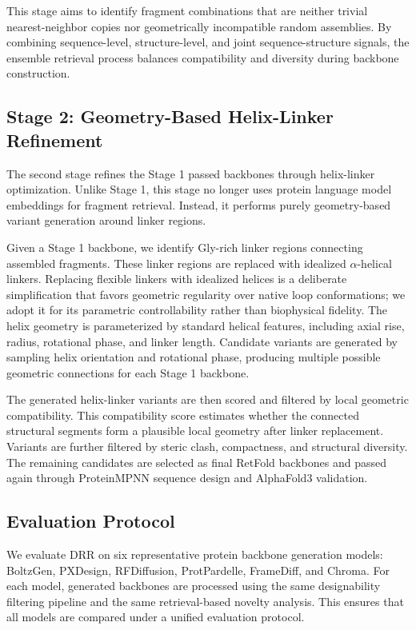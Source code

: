 \documentclass[letterpaper]{article} %
\begin{document}
This stage aims to identify fragment combinations that are neither trivial nearest-neighbor copies nor geometrically incompatible random assemblies. By combining sequence-level, structure-level, and joint sequence-structure signals, the ensemble retrieval process balances compatibility and diversity during backbone construction.

\subsection{Stage 2: Geometry-Based Helix-Linker Refinement}

The second stage refines the Stage 1 passed backbones through helix-linker optimization. Unlike Stage 1, this stage no longer uses protein language model embeddings for fragment retrieval. Instead, it performs purely geometry-based variant generation around linker regions.

Given a Stage 1 backbone, we identify Gly-rich linker regions connecting assembled fragments. These linker regions are replaced with idealized $\alpha$-helical linkers. Replacing flexible linkers with idealized helices is a deliberate simplification that favors geometric regularity over native loop conformations; we adopt it for its parametric controllability rather than biophysical fidelity. The helix geometry is parameterized by standard helical features, including axial rise, radius, rotational phase, and linker length. Candidate variants are generated by sampling helix orientation and rotational phase, producing multiple possible geometric connections for each Stage 1 backbone.

The generated helix-linker variants are then scored and filtered by local geometric compatibility. This compatibility score estimates whether the connected structural segments form a plausible local geometry after linker replacement. Variants are further filtered by steric clash, compactness, and structural diversity. The remaining candidates are selected as final RetFold backbones and passed again through ProteinMPNN sequence design and AlphaFold3 validation.

\subsection{Evaluation Protocol}

We evaluate DRR on six representative protein backbone generation models: BoltzGen, PXDesign, RFDiffusion, ProtPardelle, FrameDiff, and Chroma. For each model, generated backbones are processed using the same designability filtering pipeline and the same retrieval-based novelty analysis. This ensures that all models are compared under a unified evaluation protocol.
\end{document}
